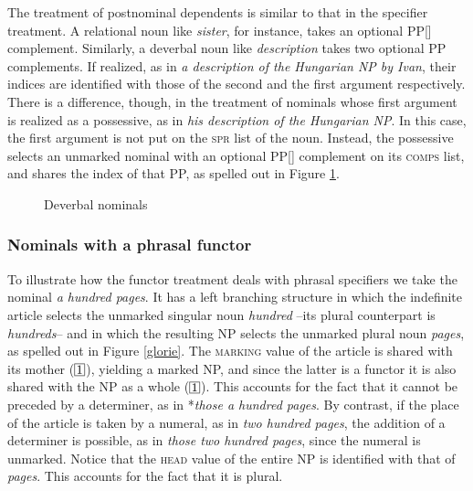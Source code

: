 \documentclass[output=paper
                ,modfonts
                ,nonflat
	        ,collection
	        ,collectionchapter
	        ,collectiontoclongg
 	        ,biblatex
                ,babelshorthands
                ,newtxmath
                ,draftmode
                ,colorlinks, citecolor=brown
]{./langsci/langscibook}
\begin{document}
The treatment of postnominal dependents is similar to that in the specifier treatment. 
A relational noun like \emph{sister}, for instance, takes an optional PP[] complement.  
Similarly, a deverbal noun like \emph{description} takes two optional PP complements. 
If realized, as in \emph{a description of the Hungarian NP by Ivan}, 
their indices are identified with those of the second and the first argument respectively. 
There is a difference, though, in the treatment of nominals 
whose first argument is realized as a possessive, as in 
\emph{his description of the Hungarian NP}. In this case, the first argument is not put on the 
\textsc{spr} list of the noun. Instead, the possessive selects an unmarked nominal with an optional 
PP[] complement on its \textsc{comps} list, and shares the index of that PP, 
as spelled out in Figure \ref{possy}. 

\begin{figure}
	\centering
{}
	\caption{\label{possy} Deverbal nominals }
\end{figure}


        
\subsubsection{Nominals with a phrasal functor} 
\label{sec-phrasal-spec}


To illustrate how the functor treatment deals with phrasal specifiers we 
take the nominal \emph{a hundred pages}. It has a left branching structure in
which the indefinite article selects the unmarked singular noun \emph{hundred} --its plural 
counterpart is \emph{hundreds}--  
and in which the resulting NP selects the unmarked plural noun 
\emph{pages}, as spelled out in Figure \ref{glorie}. The  
\textsc{marking} value of the article is shared with its mother ($\avmbox{1}$), 
yielding a marked NP, and since the latter is a functor it is also shared with 
the NP as a whole ($\avmbox{1}$). 
This accounts for the fact that it cannot be preceded by a determiner, 
as in *\emph{those a hundred pages}. By contrast, if the place of the article is taken 
by a numeral, as in \emph{two hundred pages}, the addition of a determiner is 
possible, as in \emph{those two hundred pages}, since the numeral is unmarked. 
Notice that the \textsc{head} value of the entire NP is identified with that 
of \emph{pages}. This accounts for the fact that it is plural.  
 
\end{document}
